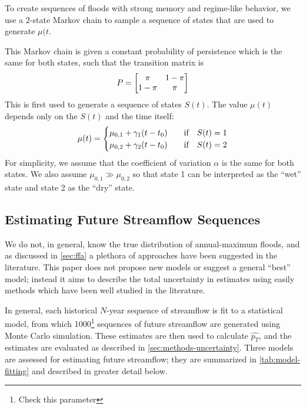 \documentclass[11pt]{article}
\begin{document}
To create sequences of floods with strong memory and regime-like behavior, we use a 2-state Markov chain to sample a sequence of states that are used to generate \(\mu(t\).

This Markov chain is given a constant probability of persistence which is the same for both states, such that the transition matrix is
\begin{equation*}
  P = \mqty[\pi & 1-\pi \\ 1-\pi & \pi]
\end{equation*}
This is first used to generate a sequence of states \(S(t)\).
The value \( \mu(t) \) depends only on the \(S(t)\) and the time itself:
\begin{equation*}
  \mu(t) = \begin{cases}
    \mu_{0,1} + \gamma_1 \qty(t - t_0) & \qqtext{if} S(t) = 1 \\
    \mu_{0,2} + \gamma_2 \qty(t - t_0) & \qqtext{if} S(t) = 2
  \end{cases}
\end{equation*}
For simplicity, we assume that the coefficient of variation \( \alpha \) is the same for both states.
We also assume \( \mu_{0, 1} \gg \mu_{0, 2} \) so that state 1 can be interpreted as the ``wet'' state and state 2 as the ``dry'' state.

\subsection{Estimating Future Streamflow Sequences\label{sec:estimation}}

We do not, in general, know the true distribution of annual-maximum floods, and as discussed in \cref{sec:ffa} a plethora of approaches have been suggested in the literature.
This paper does not propose new models or suggest a general ``best'' model; instead it aims to describe the total uncertainty in estimates using easily methods which have been well studied in the literature.

In general, each historical \(N\)-year sequence of streamflow is fit to a statistical model, from which 1000\footnote{Check this parameter} sequences of future streamflow are generated using Monte Carlo simulation.
These estimates are then used to calculate \( \hat{p_T} \), and the estimates are evaluated as described in \cref{sec:methods-uncertainty}.
Three models are assessed for estimating future streamflow; they are summarized in \cref{tab:model-fitting} and described in greater detail below.
\end{document}
